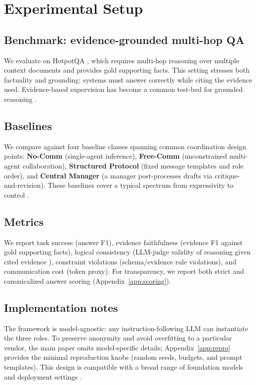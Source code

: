 \documentclass{article}
\theoremstyle{plain}
\theoremstyle{definition}
\begin{document}
\section{Experimental Setup}
\label{sec:experiments}
\subsection{Benchmark: evidence-grounded multi-hop QA}
We evaluate on HotpotQA \citep{yang2018hotpotqa}, which requires multi-hop reasoning over multiple context documents and provides gold supporting facts. This setting stresses both factuality and grounding: systems must answer correctly while citing the evidence used. Evidence-based supervision has become a common test-bed for grounded reasoning \citep{thorne2018fever,kwiatkowski2019nq}.

\subsection{Baselines}
We compare against four baseline classes spanning common coordination design points:
\textbf{No-Comm} (single-agent inference),
\textbf{Free-Comm} (unconstrained multi-agent collaboration),
\textbf{Structured Protocol} (fixed message templates and role order),
and \textbf{Central Manager} (a manager post-processes drafts via critique-and-revision).
These baselines cover a typical spectrum from expressivity to control \citep{du2024debate,wu2023autogen}.

\subsection{Metrics}
We report task success (answer F1), evidence faithfulness (evidence F1 against gold supporting facts), logical consistency (LLM-judge validity of reasoning given cited evidence \citep{zheng2023judging,liu2023geval}), constraint violations (schema/evidence rule violations), and communication cost (token proxy). For transparency, we report both strict and canonicalized answer scoring (Appendix~\ref{app:scoring}).

\subsection{Implementation notes}
The framework is model-agnostic: any instruction-following LLM can instantiate the three roles. To preserve anonymity and avoid overfitting to a particular vendor, the main paper omits model-specific details; Appendix~\ref{app:repro} provides the minimal reproduction knobs (random seeds, budgets, and prompt templates).
This design is compatible with a broad range of foundation models and deployment settings \citep{brown2020gpt3,touvron2023llama}.
\end{document}
